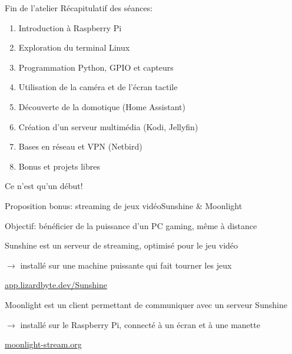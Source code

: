 \documentclass[
aspectratio=169 %
]{beamer}
\begin{document}
\begin{frame}{Fin de l'atelier}
    Récapitulatif des séances:
    \begin{enumerate}
        \item Introduction à Raspberry Pi
        \item Exploration du terminal Linux
        \item Programmation Python, GPIO et capteurs
        \item Utilisation de la caméra et de l'écran tactile
        \item Découverte de la domotique (Home Assistant)
        \item Création d'un serveur multimédia (Kodi, Jellyfin)
        \item Bases en réseau et VPN (Netbird)
        \item Bonus et projets libres
    \end{enumerate}

    \bigskip
    \alert{Ce n'est qu'un début!}

\end{frame}

\begin{frame}{Proposition bonus: streaming de jeux vidéo}{Sunshine \& Moonlight}

    Objectif: bénéficier de la puissance d'un PC gaming, même à distance

    \bigskip

    Sunshine est un serveur de streaming, optimisé pour le jeu vidéo

    \(\rightarrow\) installé sur une machine puissante qui fait tourner les jeux

    \medskip
    \url{app.lizardbyte.dev/Sunshine}

    \bigskip
    Moonlight est un client permettant de communiquer avec un serveur Sunshine

    \(\rightarrow\) installé sur le Raspberry Pi, connecté à un écran et à une
    manette
    \medskip

    \url{moonlight-stream.org}

\end{frame}
\end{document}
